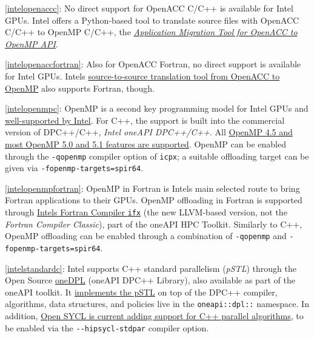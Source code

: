 \item \ref{intelopenaccc}: No direct support for OpenACC C/C++ is available for Intel GPUs. Intel offers a Python-based tool to translate source files with OpenACC C/C++ to OpenMP C/C++, the \href{https://github.com/intel/intel-application-migration-tool-for-openacc-to-openmp}{\emph{Application Migration Tool for OpenACC to OpenMP API}}.
\item \ref{intelopenaccfortran}: Also for OpenACC Fortran, no direct support is available for Intel GPUs. Intel\textquotesingle s \href{https://github.com/intel/intel-application-migration-tool-for-openacc-to-openmp}{source-to-source translation tool from OpenACC to OpenMP} also supports Fortran, though.
\item \ref{intelopenmpc}: OpenMP is a second key programming model for Intel GPUs and \href{https://www.intel.com/content/www/us/en/develop/documentation/get-started-with-cpp-fortran-compiler-openmp/top.html}{well-supported by Intel}. For C++, the support is built into the commercial version of DPC++/C++, \emph{Intel oneAPI DPC++/C++}. All \href{https://www.intel.com/content/www/us/en/developer/articles/technical/openmp-features-and-extensions-supported-in-icx.html}{OpenMP 4.5 and most OpenMP 5.0 and 5.1 features are supported}. OpenMP can be enabled through the \texttt{-qopenmp} compiler option of \texttt{icpx}; a suitable offloading target can be given via \texttt{-fopenmp-targets=spir64}.
\item \ref{intelopenmpfortran}: OpenMP in Fortran is Intel\textquotesingle s main selected route to bring Fortran applications to their GPUs. OpenMP offloading in Fortran is supported through \href{https://www.intel.com/content/www/us/en/docs/fortran-compiler/developer-guide-reference/2023-2/overview.html}{Intel\textquotesingle s Fortran Compiler \texttt{ifx}} (the new LLVM-based version, not the \emph{Fortran Compiler Classic}), part of the oneAPI HPC Toolkit. Similarly to C++, OpenMP offloading can be enabled through a combination of \texttt{-qopenmp} and \texttt{-fopenmp-targets=spir64}.
\item \ref{intelstandardc}: Intel supports C++ standard parallelism (\emph{pSTL}) through the Open Source \href{https://oneapi-src.github.io/oneDPL/index.html}{oneDPL} (oneAPI DPC++ Library), also available as part of the oneAPI toolkit. It \href{https://oneapi-src.github.io/oneDPL/parallel_api_main.html}{implements the pSTL} on top of the DPC++ compiler, algorithms, data structures, and policies live in the \texttt{oneapi::dpl::} namespace. In addition, \href{https://github.com/OpenSYCL/OpenSYCL/pull/1088}{Open SYCL is current adding support for C++ parallel algorithms}, to be enabled via the \texttt{-\/-hipsycl-stdpar} compiler option.
